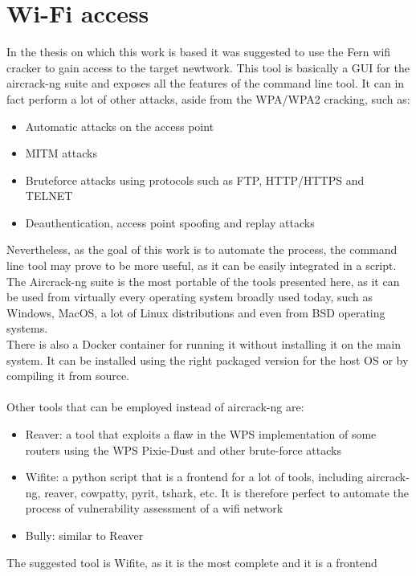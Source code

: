 \chapter{Wi-Fi access}
In the thesis on which\cite{previouswork} this work is based it was suggested
to use the Fern wifi cracker\cite{fern} to gain access to the target newtwork.
This tool is basically a GUI for the aircrack-ng suite\cite{aircrack} and
exposes all the features of the command line tool. It can in fact perform
a lot of other attacks, aside from the WPA/WPA2 cracking, such as:
\begin{itemize}
    \item Automatic attacks on the access point
    \item MITM attacks
    \item Bruteforce attacks using protocols such as FTP, HTTP/HTTPS and TELNET
    \item Deauthentication, access point spoofing and replay attacks
\end{itemize}
Nevertheless, as the goal of this work is to automate the process, the command
line tool may prove to be more useful, as it can be easily integrated in a
script.\\
The Aircrack-ng suite is the most portable of the tools presented here, as it
can be used from virtually every operating system broadly used today, such as 
Windows, MacOS, a lot of Linux distributions and even from BSD operating systems.\\
There is also a Docker container for running it without installing it on the
main system. It can be installed using the right packaged version for the host OS
or by compiling it from source\cite{aircrack-git}.\\\\
Other tools that can be employed instead of aircrack-ng are:
\begin{itemize}
    \item Reaver\cite{reaver}: a tool that exploits a flaw in the WPS
        implementation of some routers using the WPS Pixie-Dust and other brute-force attacks
    \item Wifite\cite{wifite}: a python script that is a frontend for a lot of 
        tools, including aircrack-ng, reaver, cowpatty, pyrit, tshark, etc. It
        is therefore perfect to automate the process of vulnerability assessment
        of a wifi network
    \item Bully\cite{bully}: similar to Reaver
\end{itemize}
The suggested tool is Wifite, as it is the most complete and it is a frontend
